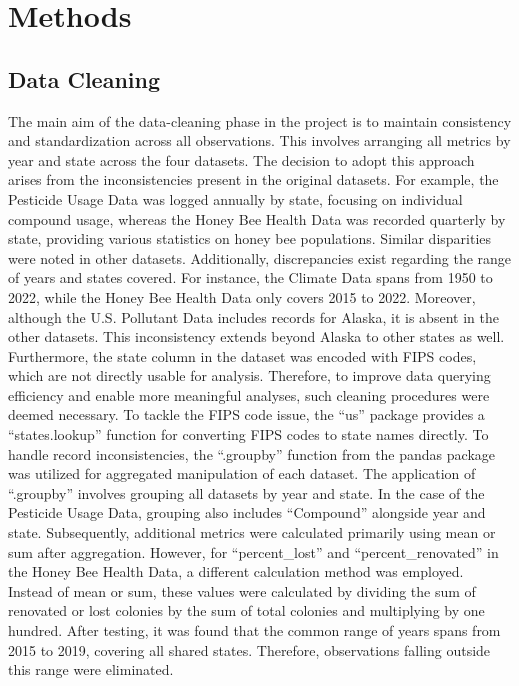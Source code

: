 \documentclass[
  letterpaper,
  DIV=11,
  numbers=noendperiod]{scrartcl}
\begin{document}
\section{Methods}\label{methods}

\subsection{Data Cleaning}\label{data-cleaning}

The main aim of the data-cleaning phase in the project is to maintain
consistency and standardization across all observations. This involves
arranging all metrics by year and state across the four datasets. The
decision to adopt this approach arises from the inconsistencies present
in the original datasets. For example, the Pesticide Usage Data was
logged annually by state, focusing on individual compound usage, whereas
the Honey Bee Health Data was recorded quarterly by state, providing
various statistics on honey bee populations. Similar disparities were
noted in other datasets. Additionally, discrepancies exist regarding the
range of years and states covered. For instance, the Climate Data spans
from 1950 to 2022, while the Honey Bee Health Data only covers 2015 to
2022. Moreover, although the U.S. Pollutant Data includes records for
Alaska, it is absent in the other datasets. This inconsistency extends
beyond Alaska to other states as well. Furthermore, the state column in
the dataset was encoded with FIPS codes, which are not directly usable
for analysis. Therefore, to improve data querying efficiency and enable
more meaningful analyses, such cleaning procedures were deemed
necessary. To tackle the FIPS code issue, the ``us'' package provides a
``states.lookup'' function for converting FIPS codes to state names
directly. To handle record inconsistencies, the ``.groupby'' function
from the pandas package was utilized for aggregated manipulation of each
dataset. The application of ``.groupby'' involves grouping all datasets
by year and state. In the case of the Pesticide Usage Data, grouping
also includes ``Compound'' alongside year and state. Subsequently,
additional metrics were calculated primarily using mean or sum after
aggregation. However, for ``percent\_lost'' and ``percent\_renovated''
in the Honey Bee Health Data, a different calculation method was
employed. Instead of mean or sum, these values were calculated by
dividing the sum of renovated or lost colonies by the sum of total
colonies and multiplying by one hundred. After testing, it was found
that the common range of years spans from 2015 to 2019, covering all
shared states. Therefore, observations falling outside this range were
eliminated.
\end{document}
